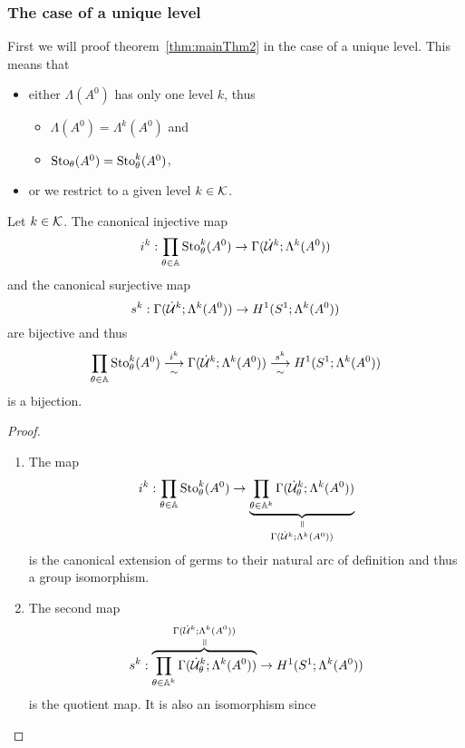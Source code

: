 \subsubsection{The case of a unique level}
\begin{comment}
  \cite[II.3.2]{Loday1994}
\end{comment}
First we will proof theorem~\ref{thm:mainThm2} in the case of a unique level.
This means that
\begin{itemize}
  \item either $\Lambda(A^0)$ has only one level $k$, thus
    \begin{itemize}
      \item $\Lambda(A^0)=\Lambda^k(A^0)$ and
      \item $\operatorname{Sto}_\theta(A^0)=\operatorname{Sto}_\theta^k(A^0)$,
    \end{itemize}
  \item or we restrict to a given level $k\in\mathcal{K}$.
\end{itemize}
\begin{lem}
  Let $k\in\mathcal{K}$.
  The canonical injective map
  \[
    i^k:\underset{\theta\in\mathbb{A}}\prod\operatorname{Sto}_\theta^k(A^0) \to
    \Gamma(\dot{\mathcal{U}}^k;\Lambda^k(A^0))
  \]
  and the canonical surjective map
  \[
    s^k:\Gamma(\dot{\mathcal{U}}^k;\Lambda^k(A^0))\to H^1(S^1;\Lambda^k(A^0))
  \]
  are bijective and thus
  \[
    \underset{\theta\in\mathbb{A}}\prod\operatorname{Sto}_\theta^k(A^0)
    \underset{\sim}{\overset{i^k}{\longrightarrow}}
    \Gamma(\dot{\mathcal{U}}^k;\Lambda^k(A^0))
    \underset{\sim}{\overset{s^k}{\longrightarrow}}
    H^1(S^1;\Lambda^k(A^0))
  \]
  is a bijection. \TODO[naturality?]
\end{lem}
\begin{proof}
  \begin{enumerate}
    \item The map
      \[
        i^k: \underset{\theta\in\A}\prod\Sto_\theta^k(A^0)
        \to
        \underset{\Gamma(\dot\cU^k;\Lambda^k(A^0))}{%
          \underset{\text{\rotatebox[origin=c]{-90}{$=$}}}{%
            \underbrace{%
              \prod_{\theta\in\A^k}\Gamma(\dot\cU_\theta^k;\Lambda^k(A^0))
            }
        }}
      \]
      is the canonical extension of germs to their natural
      arc of definition and thus a group isomorphism.
    \item The second map
      \[
        s^k:
        \overset{\Gamma(\dot\cU^k;\Lambda^k(A^0))}{%
          \overset{\text{\rotatebox[origin=c]{-90}{$=$}}}{%
            \overbrace{%
              \prod_{\theta\in\A^k}\Gamma(\dot\cU_\theta^k;\Lambda^k(A^0))
            }
        }}
        \to
        H^1(S^1;\Lambda^k(A^0))
      \]
      is the quotient map. It is also an isomorphism since \TODO{}
  \end{enumerate}
\end{proof}

